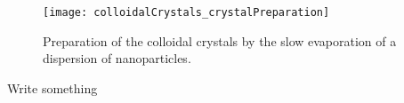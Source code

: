 \documentclass[\main/dresen_thesis.tex]{subfiles}
\begin{document}
  \begin{figure}[tb]
    \centering
    \texttt{[image: colloidalCrystals\_crystalPreparation]}
    \caption{\label{fig:colloidalCrystals:preparation:image}Preparation of the colloidal crystals by the slow evaporation of a dispersion of nanoparticles.}
  \end{figure}

  Write something


\end{document}
